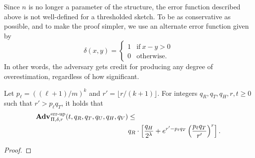Since $n$ is no longer a parameter of the structure, the error function
described above is not well-defined for a thresholded sketch. To be as
conservative as possible, and to make the proof simpler, we use an alternate
error function given by
\begin{equation}
  \delta(x, y) =
  \begin{cases}
    1 & \text{if}\ x - y > 0 \\
    0 & \text{otherwise.}
  \end{cases}
\end{equation}
In other words, the adversary gets credit for producing any degree of
overestimation, regardless of how significant.

\begin{theorem}\label{thm:scms-erreps-th}
Let $p_\ell = ((\ell+1)/m)^k$ and $r' = \lfloor r/(k+1) \rfloor$. For integers $q_R, q_T, q_H, r, t \geq 0$ such
that $r' > p_\ell q_T$, it holds that
  \begin{equation*}
  \begin{aligned}
    \Adv{\errep}_{\Pi,\delta,r}(t, q_R,q_T,q_U,q_H,q_V) &\leq \\
     & q_R \cdot \left[\frac{q_H}{2^\lambda} + e^{r'-p_\ell q_T}\left(\frac{p_\ell q_T}{r'}\right)^r\right].
  \end{aligned}
\end{equation*}
\end{theorem}

\begin{proof}
  
\end{proof}